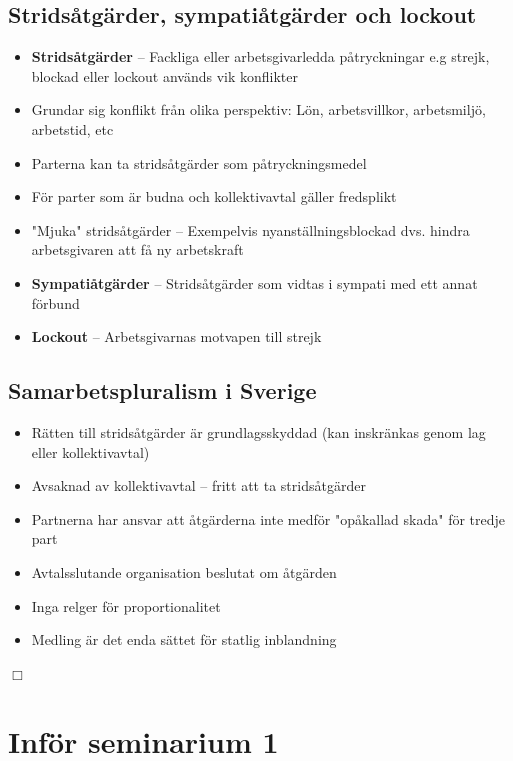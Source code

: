\documentclass[12pt]{article}
\begin{document}
\subsection{Stridsåtgärder, sympatiåtgärder och lockout}
\begin{itemize}
    \item \textbf{Stridsåtgärder} -- Fackliga eller arbetsgivarledda påtryckningar e.g strejk, blockad eller lockout används vik konflikter
    \item Grundar sig konflikt från olika perspektiv: Lön, arbetsvillkor, arbetsmiljö, arbetstid, etc
    \item Parterna kan ta stridsåtgärder som påtryckningsmedel
    \item För parter som är budna och kollektivavtal gäller fredsplikt
    \item "Mjuka" stridsåtgärder -- Exempelvis nyanställningsblockad dvs. hindra arbetsgivaren att få ny arbetskraft
    \item \textbf{Sympatiåtgärder} -- Stridsåtgärder som vidtas i sympati med ett annat förbund
    \item \textbf{Lockout} -- Arbetsgivarnas motvapen till strejk
\end{itemize}

\subsection{Samarbetspluralism i Sverige}
\begin{itemize}
    \item Rätten till stridsåtgärder är grundlagsskyddad (kan inskränkas genom lag eller kollektivavtal)
    \item Avsaknad av kollektivavtal -- fritt att ta stridsåtgärder
    \item Partnerna har ansvar att åtgärderna inte medför "opåkallad skada" för tredje part
    \item Avtalsslutande organisation beslutat om åtgärden 
    \item Inga relger för proportionalitet
    \item Medling är det enda sättet för statlig inblandning
\end{itemize}

{\Huge $\Box$ }

\newpage

\section{Inför seminarium 1}
\end{document}
